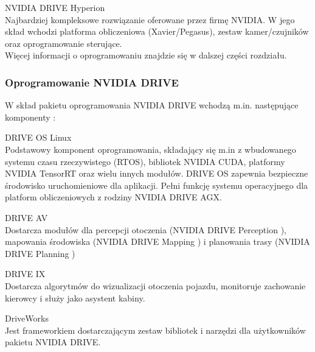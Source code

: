 \begin{enumerate*}
\item NVIDIA DRIVE Hyperion \\
Najbardziej kompleksowe rozwiązanie oferowane przez firmę NVIDIA. W jego skład wchodzi platforma obliczeniowa (Xavier/Pegasus), zestaw kamer/czujników oraz oprogramowanie sterujące. \\
Więcej informacji o oprogramowaniu znajdzie się w dalszej części rozdziału.
\end{enumerate*}

\subsubsection{Oprogramowanie NVIDIA DRIVE}
W skład pakietu oprogramowania NVIDIA DRIVE wchodzą m.in. następujące komponenty \cite{nvidia:drive:software}:
\begin{enumerate*}
\item DRIVE OS Linux \\
Podstawowy komponent oprogramowania, składający się m.in z wbudowanego systemu czasu rzeczywistego (RTOS), bibliotek NVIDIA CUDA, platformy NVIDIA TensorRT \cite{nvidia:tensorRT} oraz wielu innych modułów. DRIVE OS zapewnia bezpieczne środowisko uruchomieniowe dla aplikacji. Pełni funkcję systemu operacyjnego dla platform obliczeniowych z rodziny NVIDIA DRIVE AGX.
\item DRIVE AV \\
Dostarcza modułów dla percepcji otoczenia (NVIDIA DRIVE Perception \cite{nvidia:drivePerception}), mapowania środowiska (NVIDIA DRIVE Mapping \cite{nvidia:driveMapping}) i planowania trasy (NVIDIA DRIVE Planning \cite{nvidia:drivePlanning})
\item DRIVE IX \\
Dostarcza algorytmów do wizualizacji otoczenia pojazdu, monitoruje zachowanie kierowcy i służy jako asystent kabiny.
\item DriveWorks \\
Jest frameworkiem dostarczającym zestaw bibliotek i narzędzi dla użytkowników pakietu NVIDIA DRIVE.
\end{enumerate*}
